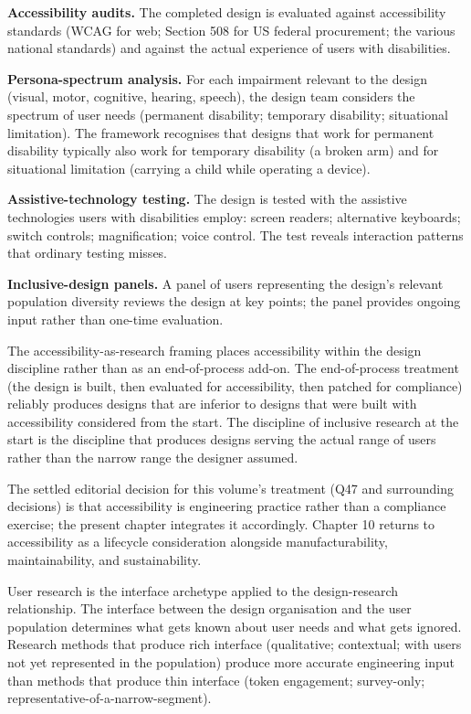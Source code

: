 \textbf{Accessibility audits.} The completed design is evaluated against accessibility standards (WCAG for web; Section 508 for US federal procurement; the various national standards) and against the actual experience of users with disabilities.

\textbf{Persona-spectrum analysis.} For each impairment relevant to the design (visual, motor, cognitive, hearing, speech), the design team considers the spectrum of user needs (permanent disability; temporary disability; situational limitation). The framework recognises that designs that work for permanent disability typically also work for temporary disability (a broken arm) and for situational limitation (carrying a child while operating a device).

\textbf{Assistive-technology testing.} The design is tested with the assistive technologies users with disabilities employ: screen readers; alternative keyboards; switch controls; magnification; voice control. The test reveals interaction patterns that ordinary testing misses.

\textbf{Inclusive-design panels.} A panel of users representing the design's relevant population diversity reviews the design at key points; the panel provides ongoing input rather than one-time evaluation.

The accessibility-as-research framing places accessibility within the design discipline rather than as an end-of-process add-on. The end-of-process treatment (the design is built, then evaluated for accessibility, then patched for compliance) reliably produces designs that are inferior to designs that were built with accessibility considered from the start. The discipline of inclusive research at the start is the discipline that produces designs serving the actual range of users rather than the narrow range the designer assumed.

The settled editorial decision for this volume's treatment (Q47 and surrounding decisions) is that accessibility is engineering practice rather than a compliance exercise; the present chapter integrates it accordingly. Chapter 10 returns to accessibility as a lifecycle consideration alongside manufacturability, maintainability, and sustainability.

\begin{archetype}[interface]
User research is the interface archetype applied to the design-research relationship. The interface between the design organisation and the user population determines what gets known about user needs and what gets ignored. Research methods that produce rich interface (qualitative; contextual; with users not yet represented in the population) produce more accurate engineering input than methods that produce thin interface (token engagement; survey-only; representative-of-a-narrow-segment).
\end{archetype}

